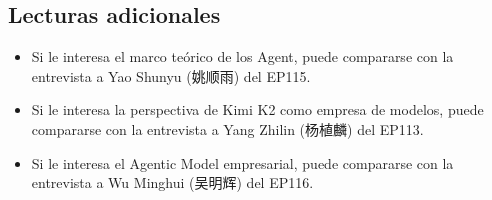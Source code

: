 \subsection{Lecturas adicionales}

\begin{itemize}
\item Si le interesa el marco teórico de los Agent, puede compararse con la entrevista a Yao Shunyu (姚顺雨) del EP115.
\item Si le interesa la perspectiva de Kimi K2 como empresa de modelos, puede compararse con la entrevista a Yang Zhilin (杨植麟) del EP113.
\item Si le interesa el Agentic Model empresarial, puede compararse con la entrevista a Wu Minghui (吴明辉) del EP116.
\end{itemize}


